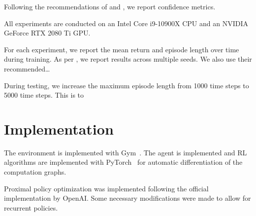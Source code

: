 
Following the recommendations of \cite{henderson_matters_2018} and \cite{agarwal_rlliable_2022},
we report confidence metrics.

All experiments are conducted on an Intel Core i9-10900X CPU and an NVIDIA GeForce RTX 2080 Ti GPU.

For each experiment, we report the mean return and episode length over time during training.
As per \cite{agarwal_rlliable_2022}, we report results across multiple seeds.
We also use their recommended\dots

During testing, we increase the maximum episode length from 1000 time steps to 5000 time steps.
This is to 

\section{Implementation}

The environment is implemented with Gym~\cite{brockman_gym_2016}. The agent is implemented and RL algorithms are implemented with PyTorch~\cite{paszke_pytorch_nodate} for automatic differentiation of the computation graphs.

Proximal policy optimization was implemented following the official implementation by OpenAI.
Some necessary modifications were made to allow for recurrent policies.










